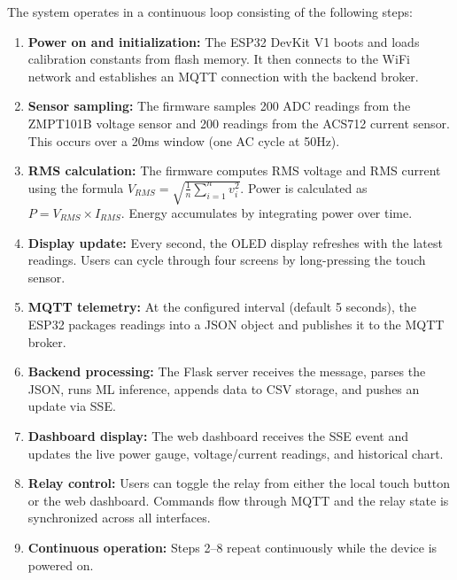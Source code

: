 \documentclass[12pt, a4paper]{article}
\begin{document}
	The system operates in a continuous loop consisting of the following steps:
	
	\begin{enumerate}[topsep=6pt, itemsep=5pt]
		\item \textbf{Power on and initialization:} The ESP32 DevKit V1 boots and loads calibration constants from flash memory. It then connects to the WiFi network and establishes an MQTT connection with the backend broker.
		
		\item \textbf{Sensor sampling:} The firmware samples 200 ADC readings from the ZMPT101B voltage sensor and 200 readings from the ACS712 current sensor. This occurs over a 20ms window (one AC cycle at 50Hz).
		
		\item \textbf{RMS calculation:} The firmware computes RMS voltage and RMS current using the formula $V_{RMS} = \sqrt{\frac{1}{n}\sum_{i=1}^{n} v_i^2}$. Power is calculated as $P = V_{RMS} \times I_{RMS}$. Energy accumulates by integrating power over time.
		
		\item \textbf{Display update:} Every second, the OLED display refreshes with the latest readings. Users can cycle through four screens by long-pressing the touch sensor.
		
		\item \textbf{MQTT telemetry:} At the configured interval (default 5 seconds), the ESP32 packages readings into a JSON object and publishes it to the MQTT broker.
		
		\item \textbf{Backend processing:} The Flask server receives the message, parses the JSON, runs ML inference, appends data to CSV storage, and pushes an update via SSE.
		
		\item \textbf{Dashboard display:} The web dashboard receives the SSE event and updates the live power gauge, voltage/current readings, and historical chart.
		
		\item \textbf{Relay control:} Users can toggle the relay from either the local touch button or the web dashboard. Commands flow through MQTT and the relay state is synchronized across all interfaces.
		
		\item \textbf{Continuous operation:} Steps 2--8 repeat continuously while the device is powered on.
	\end{enumerate}
	
\end{document}
